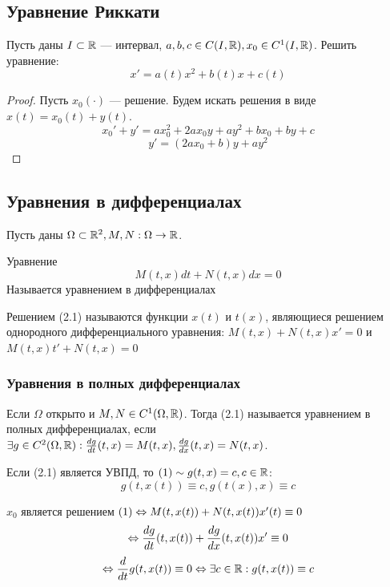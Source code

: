 \subsection{Уравнение Риккати}
\begin{problem}
    Пусть даны \(I \subset \mathbb{R}\) --- интервал, \(a, b, c \in C(I, \mathbb{R}), x_0 \in C^1(I, \mathbb{R})\). Решить уравнение:
    \[x' = a(t)x^2 + b(t)x + c(t)\]
\end{problem}
\begin{proof}
    Пусть \(x_0(\cdot)\) --- решение. Будем искать решения в виде \(x(t) = x_0(t) + y(t)\). 
    \[x_0' + y' = ax_0^2 + 2ax_0y + ay^2 + bx_0 + by + c\]
    \[y' = (2ax_0 + b)y + ay^2\]
\end{proof}

\subsection{Уравнения в дифференциалах}
Пусть даны \(\Omega \subset \mathbb{R}^2, M, N: \Omega \rightarrow \mathbb{R}\).

\begin{definition}
    Уравнение
    \begin{equation}
        M(t, x)dt + N(t, x)dx = 0
    \end{equation}
    Называется уравнением в дифференциалах
\end{definition}

\begin{definition}
    Решением (2.1) называются функции \(x(t)\) и \(t(x)\), являющиеся решением однородного дифференциального уравнения: \(M(t, x) + N(t, x)x' = 0\) и \(M(t, x)t' + N(t, x) = 0\)
\end{definition}

\subsubsection{Уравнения в полных дифференциалах}
\begin{definition}
    Если \(\Omega\) открыто и \(M, N \in C^1(\Omega, \mathbb{R})\). Тогда (2.1) называется уравнением в полных дифференциалах, если \(\exists g \in C^2(\Omega, \mathbb{R}): \frac{dg}{dt}(t, x) = M(t, x), \frac{dg}{dx}(t, x) = N(t, x)\).
\end{definition}

Если (2.1) является УВПД, то \((1) \sim g(t, x) = c, c \in \mathbb{R}\):
\[g(t, x(t)) \equiv c, g(t(x), x) \equiv c\]

\(x_0\) является решением \((1) \Leftrightarrow M(t, x(t)) + N(t, x(t))x'(t) \equiv 0\)
\[\Leftrightarrow \frac{dg}{dt}(t, x(t)) + \frac{dg}{dx}(t, x(t))x' \equiv 0\]
\[\Leftrightarrow \frac{d}{dt}g(t, x(t)) \equiv 0 \Leftrightarrow \exists c \in \mathbb{R}: g(t, x(t)) \equiv c\]

